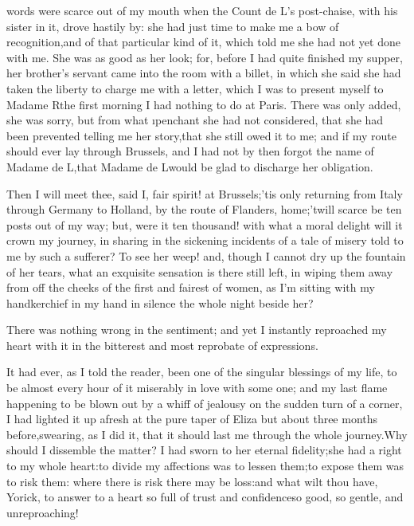 \documentclass[twoside]{article}
\begin{document}
 words were scarce out of my mouth when the Count de L\tsk ’s post-chaise,
with his sister in it, drove hastily by: she had just time to make me a
bow of recognition,\tsk and of that particular kind of it, which told me she
had not yet done with me.  She was as good as her look; for, before I had
quite finished my supper, her brother’s servant came into the room with a
billet, in which she said she had taken the liberty to charge me with a
letter, which I was to present myself to Madame R\tsk  the first morning I
had nothing to do at Paris.  There was only added, she was sorry, but
from what \i{penchant} she had not considered, that she had been prevented
telling me her story,\tsk that she still owed it to me; and if my route
should ever lay through Brussels, and I had not by then forgot the name
of Madame de L\tsk ,\tsk that Madame de L\tsk  would be glad to discharge her
obligation.

Then I will meet thee, said I, fair spirit! at Brussels;\tsk ’tis only
returning from Italy through Germany to Holland, by the route of
Flanders, home;\tsk ’twill scarce be ten posts out of my way; but, were it
ten thousand! with what a moral delight will it crown my journey, in
sharing in the sickening incidents of a tale of misery told to me by such
a sufferer?  To see her weep! and, though I cannot dry up the fountain of
her tears, what an exquisite sensation is there still left, in wiping
them away from off the cheeks of the first and fairest of women, as I’m
sitting with my handkerchief in my hand in silence the whole night beside
her?

There was nothing wrong in the sentiment; and yet I instantly reproached
my heart with it in the bitterest and most reprobate of expressions.

It had ever, as I told the reader, been one of the singular blessings of
my life, to be almost every hour of it miserably in love with some one;
and my last flame happening to be blown out by a whiff of jealousy on the
sudden turn of a corner, I had lighted it up afresh at the pure taper of
Eliza but about three months before,\tsk swearing, as I did it, that it
should last me through the whole journey.\tsk Why should I dissemble the
matter?  I had sworn to her eternal fidelity;\tsk she had a right to my whole
heart:\tsk to divide my affections was to lessen them;\tsk to expose them was to
risk them: where there is risk there may be loss:\tsk and what wilt thou
have, Yorick, to answer to a heart so full of trust and confidence\tsk so
good, so gentle, and unreproaching!
\end{document}
